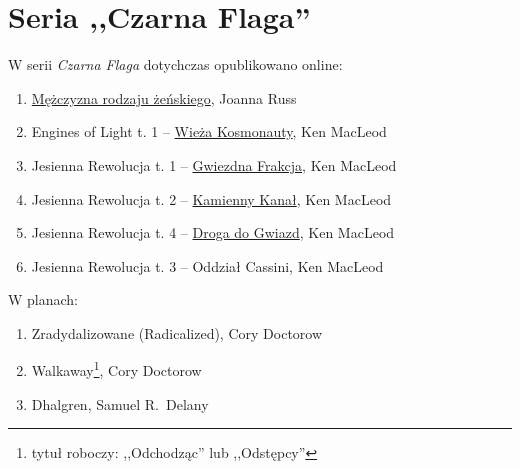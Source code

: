 \documentclass[oneside,polish,11pt,sfheadings]{mwbk}
\begin{document}
\chapter*{Seria ,,Czarna Flaga''}

\begin{center}
\begin{large}
W serii \textit{Czarna Flaga} dotychczas opublikowano online:
\end{large} 
\end{center}


\begin{enumerate}
\item \href{https://archive.org/details/joanna-russ-mezczyzna-rodzaju-zenskiego/Joanna_Russ_M\%C4\%99\%C5\%BCczyzna_rodzaju_\%C5\%BCe\%C5\%84skiego}{Mężczyzna rodzaju żeńskiego}, Joanna Russ
\item Engines of Light t. 1 -- \href{https://archive.org/details/ken-macleod-wieza-kosmonauty}{Wieża Kosmonauty}, Ken MacLeod
\item Jesienna Rewolucja t. 1 -- \href{https://archive.org/details/ken-mac-leod-jesienna-rewolucja-gwiezdna-frakcja}{Gwiezdna Frakcja}, Ken MacLeod
\item Jesienna Rewolucja t. 2 -- \href{https://archive.org/details/ken-mac-leod-jesienna-rewolucja-kamienny-kanal}{Kamienny Kanał}, Ken MacLeod
\item Jesienna Rewolucja t. 4 --  \href{https://archive.org/details/ken-mac-leod-jesienna-rewolucja-droga-do-gwiazd}{Droga do Gwiazd}, Ken MacLeod
\item Jesienna Rewolucja t. 3 -- Oddział Cassini, Ken MacLeod
\end{enumerate}

\begin{center}

\begin{large}W planach:\end{large}\end{center}

\begin{enumerate}
\item Zradydalizowane (Radicalized), Cory Doctorow
\item Walkaway\footnote{tytuł roboczy: ,,Odchodząc'' lub ,,Odstępcy''}, Cory Doctorow
\item Dhalgren, Samuel R.~Delany
\end{enumerate}

\newpage
\end{document}
